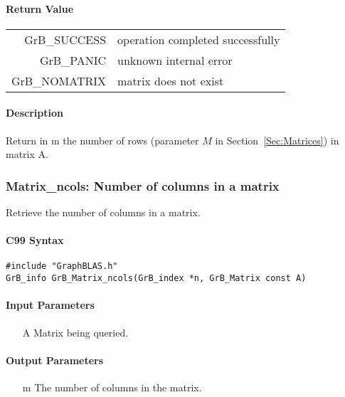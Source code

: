 \paragraph{Return Value}

\begin{tabular}{rl}
{\sf GrB\_SUCCESS}	& operation completed successfully \\
{\sf GrB\_PANIC}	& unknown internal error \\
{\sf GrB\_NOMATRIX}	& matrix does not exist \\
\end{tabular}

\paragraph{Description}

Return in {\sf m} the number of rows (parameter $M$ in Section~\ref{Sec:Matrices}) in matrix {\sf A}.


\subsubsection{{\sf Matrix\_ncols}: Number of columns in a matrix}

Retrieve the number of columns in a matrix.

\paragraph{C99 Syntax}

\begin{verbatim}
#include "GraphBLAS.h"
GrB_info GrB_Matrix_ncols(GrB_index *n, GrB_Matrix const A)
\end{verbatim}

\paragraph{Input Parameters}

\begin{itemize}
	\item[{\sf A}] Matrix being queried.
\end{itemize}

\paragraph{Output Parameters}
\begin{itemize}
	\item[{\sf m}] The number of columns in the matrix.
\end{itemize}

